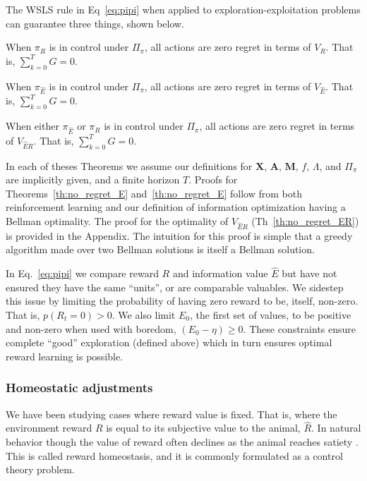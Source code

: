 The WSLS rule in Eq~\ref{eq:pipi} when applied to exploration-exploitation problems can guarantee three things, shown below. 

\begin{theorem}
	\label{th:no_regret_R}
	When $\pi_R$ is in control under $\Pi_{\pi}$, all actions are zero regret in terms of $V_R$. That is, $\sum_{k=0}^{T} G = 0$.
\end{theorem}

\begin{theorem}
	\label{th:no_regret_E}
	When $\pi_{\hat E}$ is in control under $\Pi_{\pi}$, all actions are zero regret in terms of $V_{\hat E}$. That is, $\sum_{k=0}^{T} G = 0$.
\end{theorem}

\begin{theorem}
	\label{th:no_regret_ER}
	When either $\pi_{\hat E}$ or $\pi_R$ is in control under $\Pi_{\pi}$, all actions are zero regret in terms of $V_{\hat{E}R}$. That is, $\sum_{k=0}^{T} G = 0$.
\end{theorem}

In each of theses Theorems we assume our definitions for $\mathbf{X}$, $\mathbf{A}$, $\mathbf{M}$, $f$, $\Lambda$, and $\Pi_{\pi}$ are implicitly given, and a finite horizon $T$. Proofs for Theorems~\ref{th:no_regret_E} and~\ref{th:no_regret_E} follow from both reinforcement learning and our definition of information optimization having a Bellman optimality. The proof for the optimality of $V_{\hat{E}R}$ (Th~\ref{th:no_regret_ER}) is provided in the Appendix. The intuition for this proof is simple that a greedy algorithm made over two Bellman solutions is itself a Bellman solution.

In Eq.~\ref{eq:pipi} we compare reward $R$ and information value $\hat E$ but have not ensured they have the same ``units'', or are comparable valuables. We sidestep this issue by limiting the probability of having zero reward to be, itself, non-zero. That is, $p(R_t=0) > 0$. We also limit $E_0$, the first set of values, to be positive and non-zero when used with boredom, $(E_0 - \eta) \geq 0$. These constraints ensure complete ``good'' exploration (defined above) which in turn ensures optimal reward learning is possible.


\subsubsection*{Homeostatic adjustments}
We have been studying cases where reward value is fixed. That is, where the environment reward $R$ is equal to its subjective value to the animal, $\hat R$. In natural behavior though the value of reward often declines as the animal reaches satiety \cite{Keramati2014,Juechems2019,Munch2020}. This is called reward homeostasis, and it is commonly formulated as a control theory problem.

